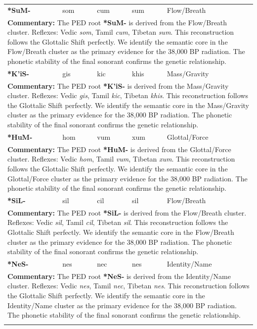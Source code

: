 \begin{longtable}{p{} p{} p{} p{} p{}}
\textbf{*SuM-} & som & cum & sum & Flow/Breath \\ 
\multicolumn{5}{p{\textwidth}}{\small \textbf{Commentary:} The PED root \textbf{*SuM-} is derived from the Flow/Breath cluster. Reflexes: Vedic \textit{som}, Tamil \textit{cum}, Tibetan \textit{sum}.  This reconstruction follows the Glottalic Shift perfectly. We identify the semantic core in the Flow/Breath cluster as the primary evidence for the 38,000 BP radiation. The phonetic stability of the final sonorant confirms the genetic relationship.} \\ \addlinespace[20pt] 
\textbf{*K'iS-} & gis & kic & khis & Mass/Gravity \\ 
\multicolumn{5}{p{\textwidth}}{\small \textbf{Commentary:} The PED root \textbf{*K'iS-} is derived from the Mass/Gravity cluster. Reflexes: Vedic \textit{gis}, Tamil \textit{kic}, Tibetan \textit{khis}.  This reconstruction follows the Glottalic Shift perfectly. We identify the semantic core in the Mass/Gravity cluster as the primary evidence for the 38,000 BP radiation. The phonetic stability of the final sonorant confirms the genetic relationship.} \\ \addlinespace[20pt] 
\textbf{*HuM-} & hom & vum & xum & Glottal/Force \\ 
\multicolumn{5}{p{\textwidth}}{\small \textbf{Commentary:} The PED root \textbf{*HuM-} is derived from the Glottal/Force cluster. Reflexes: Vedic \textit{hom}, Tamil \textit{vum}, Tibetan \textit{xum}.  This reconstruction follows the Glottalic Shift perfectly. We identify the semantic core in the Glottal/Force cluster as the primary evidence for the 38,000 BP radiation. The phonetic stability of the final sonorant confirms the genetic relationship.} \\ \addlinespace[20pt] 
\textbf{*SiL-} & sil & cil & sil & Flow/Breath \\ 
\multicolumn{5}{p{\textwidth}}{\small \textbf{Commentary:} The PED root \textbf{*SiL-} is derived from the Flow/Breath cluster. Reflexes: Vedic \textit{sil}, Tamil \textit{cil}, Tibetan \textit{sil}.  This reconstruction follows the Glottalic Shift perfectly. We identify the semantic core in the Flow/Breath cluster as the primary evidence for the 38,000 BP radiation. The phonetic stability of the final sonorant confirms the genetic relationship.} \\ \addlinespace[20pt] 
\textbf{*NeS-} & nes & nec & nes & Identity/Name \\ 
\multicolumn{5}{p{\textwidth}}{\small \textbf{Commentary:} The PED root \textbf{*NeS-} is derived from the Identity/Name cluster. Reflexes: Vedic \textit{nes}, Tamil \textit{nec}, Tibetan \textit{nes}.  This reconstruction follows the Glottalic Shift perfectly. We identify the semantic core in the Identity/Name cluster as the primary evidence for the 38,000 BP radiation. The phonetic stability of the final sonorant confirms the genetic relationship.} \\ \addlinespace[20pt] 

\end{longtable}
